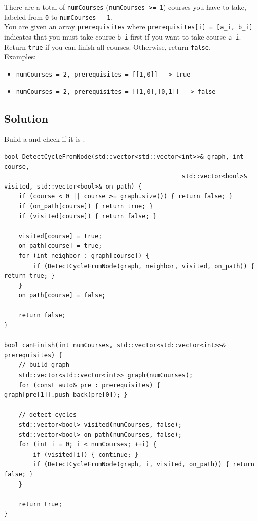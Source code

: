 There are a total of {\colorbox{CodeBackground}{\lstinline|numCourses|}} ({\colorbox{CodeBackground}{\lstinline|numCourses >= 1|}}) courses you have to take, labeled from {\colorbox{CodeBackground}{\lstinline|0|}} to {\colorbox{CodeBackground}{\lstinline|numCourses - 1|}}.\\

You are given an array {\colorbox{CodeBackground}{\lstinline|prerequisites|}} where {\colorbox{CodeBackground}{\lstinline|prerequisites[i] = [a_i, b_i]|}} indicates that you must take course {\colorbox{CodeBackground}{\lstinline|b_i|}} first if you want to take course {\colorbox{CodeBackground}{\lstinline|a_i|}}.\\

Return {\colorbox{CodeBackground}{\lstinline|true|}} if you can finish all courses. Otherwise, return {\colorbox{CodeBackground}{\lstinline|false|}}.\\

Examples:
\begin{itemize}
\item {\colorbox{CodeBackground}{\lstinline|numCourses = 2, prerequisites = [[1,0]] --> true|}}
\item {\colorbox{CodeBackground}{\lstinline|numCourses = 2, prerequisites = [[1,0],[0,1]] --> false|}}
\end{itemize}

\subsection*{Solution}
Build a {\color{blue}{dependency graph}} and check if it is {\color{blue}{cyclic}}.

\begin{lstlisting}
bool DetectCycleFromNode(std::vector<std::vector<int>>& graph, int course,
												 std::vector<bool>& visited, std::vector<bool>& on_path) {
	if (course < 0 || course >= graph.size()) { return false; }
	if (on_path[course]) { return true; }
	if (visited[course]) { return false; }
	
	visited[course] = true;
	on_path[course] = true;
	for (int neighbor : graph[course]) {
		if (DetectCycleFromNode(graph, neighbor, visited, on_path)) { return true; }
	}
	on_path[course] = false;
	
	return false;
}

bool canFinish(int numCourses, std::vector<std::vector<int>>& prerequisites) {
	// build graph
	std::vector<std::vector<int>> graph(numCourses);
	for (const auto& pre : prerequisites) { graph[pre[1]].push_back(pre[0]); }
	
	// detect cycles
	std::vector<bool> visited(numCourses, false);
	std::vector<bool> on_path(numCourses, false);
	for (int i = 0; i < numCourses; ++i) {
		if (visited[i]) { continue; }
		if (DetectCycleFromNode(graph, i, visited, on_path)) { return false; }
	}
	
	return true;
}
\end{lstlisting}

